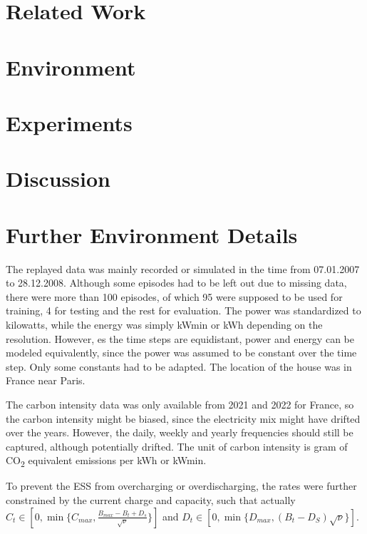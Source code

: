 \documentclass{article}
\theoremstyle{plain}
\theoremstyle{definition}
\theoremstyle{remark}
\begin{document}
\section{Related Work}\label{sec:related_work}


\section{Environment}\label{sec:environment}


\section{Experiments}\label{sec:limitations}


\section{Discussion}\label{sec:discussion}






\newpage
\appendix
\onecolumn


\section{Further Environment Details} \label{sec:environment_details}
The replayed data was mainly recorded or simulated  in the time from 07.01.2007 to 28.12.2008. Although some episodes had to be left out due to missing data, there were more than 100 episodes, of which 95 were supposed to be used for training, 4 for testing and the rest for evaluation. The power was standardized to kilowatts, while the energy was simply kWmin or kWh depending on the resolution. However, es the time steps are equidistant, power and energy can be modeled equivalently, since the power was assumed to be constant over the time step. Only some constants had to be adapted. The location of the house was in France near Paris.
\par
The carbon intensity data was only available from 2021 and 2022 for France, so the carbon intensity might be biased, since the electricity mix might have drifted over the years. However, the daily, weekly and yearly frequencies should still be captured, although potentially drifted. The unit of carbon intensity is gram of CO\textsubscript{2} equivalent emissions per kWh or kWmin.
\par To prevent the ESS from overcharging or overdischarging, the rates were further constrained by the current charge and capacity, such that actually $C_t \in [0, \min\{C_{max}, \frac{B_{max} - B_t + D_s}{\sqrt{\nu}}\}]$ and $D_t \in [0, \min\{D_{max}, (B_t - D_S) \sqrt{\nu}\}]$.
\end{document}
